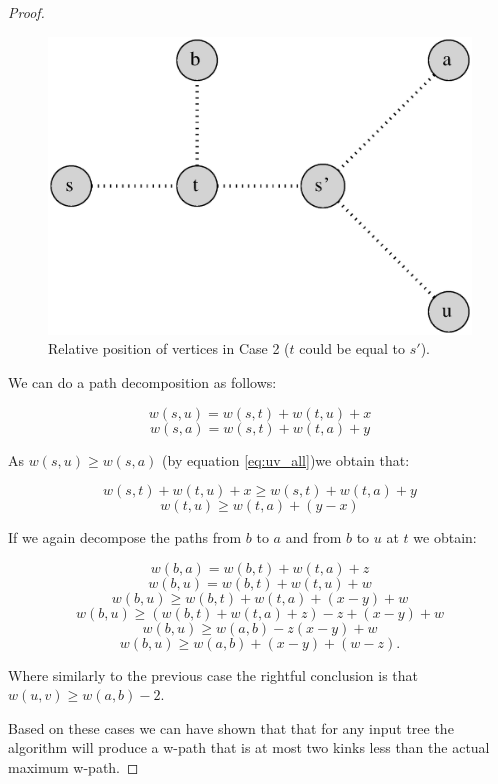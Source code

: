 \begin{proof}
\begin{figure}%
    \centering
    \includegraphics[center, scale=0.5 ]{./images/2xbfs-case-2.eps}
    \caption{Relative position of vertices in Case 2 ($t$ could be equal to $s'$). }%
    \label{fig:case2}%
\end{figure}


We can do a path decomposition as follows:

$$ w(s, u) = w(s, t) + w(t, u) + x $$
$$ w(s, a) = w(s, t) + w(t, a) + y $$

As $w(s, u) \ge w(s, a)$ (by equation \ref{eq:uv_all})we obtain that:

$$ w(s, t) + w(t, u) + x  \ge w(s, t) + w(t, a) + y $$
$$ w(t, u) \ge w(t, a) + (y - x) $$

If we again decompose the paths from $b$ to $a$ and from $b$ to $u$ at $t$ we obtain:

$$ w(b, a) = w(b, t) + w(t, a) + z  $$
$$ w(b, u) = w(b, t) + w(t, u) + w  $$
$$ w(b, u) \ge w(b, t) + w(t, a) + (x - y) + w $$
$$ w(b, u) \ge (w(b, t) + w(t, a) + z) - z + (x - y) + w $$
$$ w(b, u) \ge w(a, b) - z (x - y) + w $$
$$ w(b, u) \ge w(a, b) + (x - y) + (w - z). $$

Where similarly to the previous case the rightful conclusion is that $ w(u, v) \ge w(a, b) - 2 $.

Based on these cases we can have shown that that for any input tree the algorithm will produce a w-path that is at most two kinks less than the actual maximum w-path.


\end{proof}

